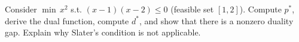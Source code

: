 \documentclass[11pt,a4paper]{article}
\begin{document}
\begin{exercise}\label{ex:noncvx-gap}
Consider $\min\, x^2$ s.t. $(x-1)(x-2) \le 0$ (feasible set $[1,2]$).
Compute $p^*$, derive the dual function, compute $d^*$, and show that
there is a nonzero duality gap. Explain why Slater's condition is
not applicable.
\end{exercise}


\end{document}

